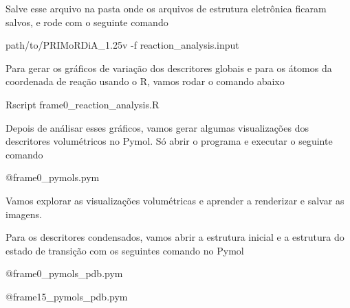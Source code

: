 \documentclass[a4paper,11pt]{refart}
\begin{document}
	Salve esse arquivo na pasta onde os arquivos de estrutura eletrônica ficaram salvos, e rode com o seguinte comando 
	
	\hspace*{-\leftmarginwidth}
	\begin{minipage}{\fullwidth}
		\begin{commandshell}path/to/PRIMoRDiA_1.25v -f reaction_analysis.input\end{commandshell}
	\end{minipage}

	Para gerar os gráficos de variação dos descritores globais e para os átomos da coordenada de reação usando o R, vamos rodar o comando abaixo
	
	
	\hspace*{-\leftmarginwidth}
	\begin{minipage}{\fullwidth}
		\begin{commandshell}Rscript frame0\_reaction\_analysis.R\end{commandshell}
	\end{minipage}

	Depois de análisar esses gráficos, vamos gerar algumas visualizações dos descritores volumétricos no Pymol. Só abrir o programa e executar o seguinte comando
	
	
 	\hspace*{-\leftmarginwidth}
	\begin{minipage}{\fullwidth}\begin{pymol}@frame0_pymols.pym\end{pymol}
	\end{minipage}
	
	Vamos explorar as visualizações volumétricas e aprender a renderizar e salvar as imagens. 
	
	Para os descritores condensados, vamos abrir a estrutura inicial e a estrutura do estado de transição com os seguintes comando no Pymol 
	
	\hspace*{-\leftmarginwidth}
	\begin{minipage}{\fullwidth}\begin{pymol}@frame0_pymols_pdb.pym\end{pymol}
	\end{minipage}


	\hspace*{-\leftmarginwidth}
	\begin{minipage}{\fullwidth}\begin{pymol}@frame15_pymols_pdb.pym\end{pymol}
	\end{minipage}
\end{document}
